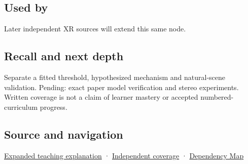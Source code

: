 \subsection{Used by}\label{appendix-8dc848f14052-used-by}

\hypertarget{appendix-8dc848f14052-used-by}{}

Later independent XR sources will extend this same node.

\subsection{Recall and next depth}\label{appendix-8dc848f14052-recall-and-next-depth}

\hypertarget{appendix-8dc848f14052-recall-and-next-depth}{}

Separate a fitted threshold, hypothesized mechanism and natural-scene validation. Pending: exact paper model verification and stereo experiments. Written coverage is not a claim of learner mastery or accepted numbered-curriculum progress.

\subsection{Source and navigation}\label{appendix-8dc848f14052-source-and-navigation}

\hypertarget{appendix-8dc848f14052-source-and-navigation}{}

\hyperref[04-visual-computing-ii-ch042-binocular-depth-changes-the-optimization-question]{Expanded teaching explanation} · \hyperref[appendix-fd090d982a15-xr01---independent-seeing-and-representation-source]{Independent coverage} · \hyperref[appendix-4ad47bdd269a]{Dependency Map}
